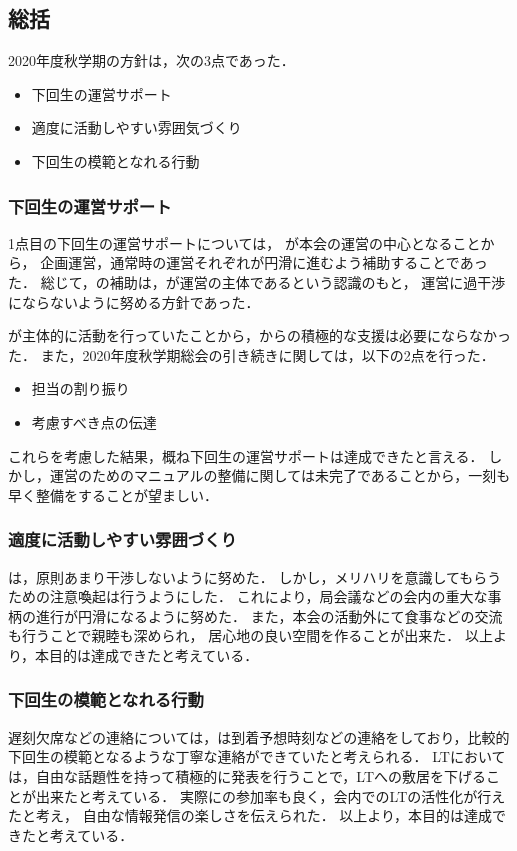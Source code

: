 \subsection*{\thirdGrade{}総括}


2020年度秋学期の\thirdGrade{}方針は，次の3点であった．
\begin {itemize}
	\item 下回生の運営サポート
	\item 適度に活動しやすい雰囲気づくり
    \item 下回生の模範となれる行動
\end {itemize}

\subsubsection*{下回生の運営サポート}

1点目の下回生の運営サポートについては，
\secondGrade{}が本会の運営の中心となることから，
企画運営，通常時の運営それぞれが円滑に進むよう補助することであった．
総じて，\thirdGrade{}の補助は，\secondGrade{}が運営の主体であるという認識のもと，
運営に過干渉にならないように努める方針であった．

\secondGrade{}が主体的に活動を行っていたことから，\thirdGrade{}からの積極的な支援は必要にならなかった．
また，2020年度秋学期総会の引き続きに関しては，以下の2点を行った．

\begin {itemize}
	\item 担当の割り振り
	\item 考慮すべき点の伝達
\end {itemize}

これらを考慮した結果，概ね下回生の運営サポートは達成できたと言える．
しかし，運営のためのマニュアルの整備に関しては未完了であることから，一刻も早く整備をすることが望ましい．

\subsubsection*{適度に活動しやすい雰囲づくり}
\thirdGrade{}は，原則あまり干渉しないように努めた．
しかし，メリハリを意識してもらうための注意喚起は行うようにした．
これにより，局会議などの会内の重大な事柄の進行が円滑になるように努めた．
また，本会の活動外にて食事などの交流も行うことで親睦も深められ，
居心地の良い空間を作ることが出来た．
以上より，本目的は達成できたと考えている．

\subsubsection*{下回生の模範となれる行動}
遅刻欠席などの連絡については，\thirdGrade{}は到着予想時刻などの連絡をしており，比較的下回生の模範となるような丁寧な連絡ができていたと考えられる．
LTにおいては，自由な話題性を持って積極的に発表を行うことで，LTへの敷居を下げることが出来たと考えている．
実際に\firstGrade{}の参加率も良く，会内でのLTの活性化が行えたと考え，
自由な情報発信の楽しさを伝えられた．
以上より，本目的は達成できたと考えている．
